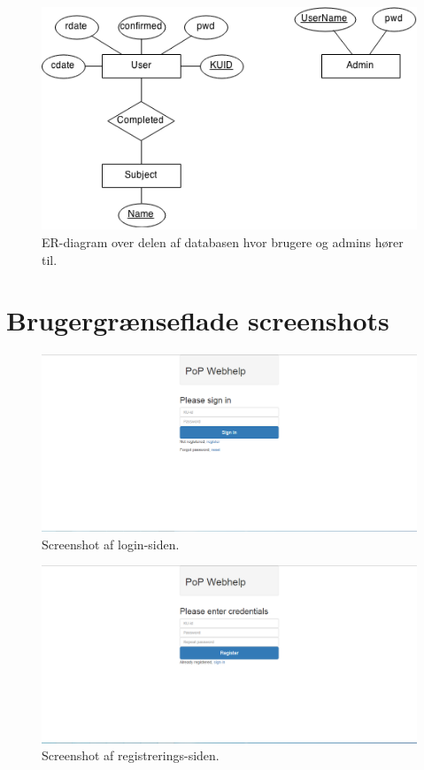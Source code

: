 \documentclass[11pt, a4paper]{article}
\begin{document}
\begin{figure}[h!]
    \centering
    \includegraphics[width=0.8\linewidth]{figures/er_diagram/User.png}
    \caption{ER-diagram over delen af databasen hvor brugere og admins hører til.}
    \label{fig:er_diagram_user}
\end{figure}

\newpage
\section{Brugergrænseflade screenshots}
\label{sec:screenshots}
\begin{figure}[h!]
    \centering
    \includegraphics[width=1\linewidth]{figures/interface/login.png}
    \caption{Screenshot af login-siden.}
    \label{fig:screenshot_login}
\end{figure}


\begin{figure}[h!]
    \centering
    \includegraphics[width=1\linewidth]{figures/interface/register.png}
    \caption{Screenshot af registrerings-siden.}
    \label{fig:screenshot_register}
\end{figure}
\end{document}
